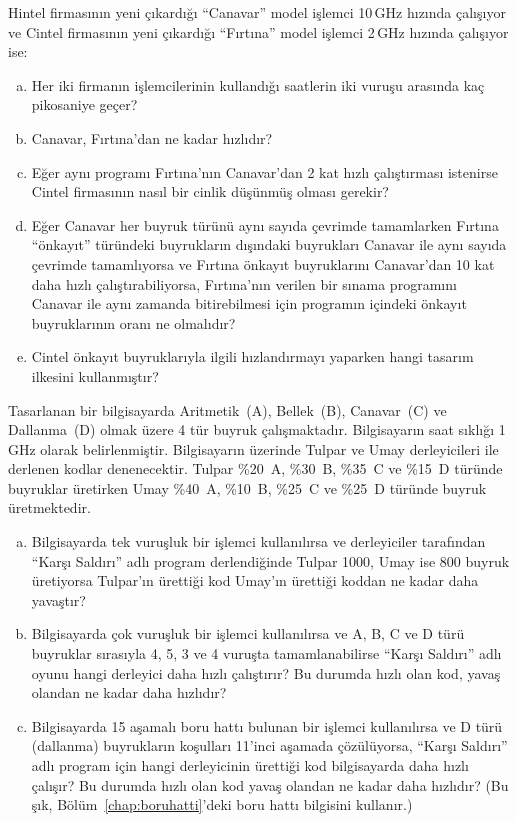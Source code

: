 \begin{alistirma}[\zor]
Hintel firmasının yeni çıkardığı ``Canavar'' model işlemci 10\,GHz hızında çalışıyor ve Cintel firmasının yeni çıkardığı ``Fırtına'' model işlemci 2\,GHz hızında çalışıyor ise:
\begin{enumerate}[(a)]
    \item Her iki firmanın işlemcilerinin kullandığı saatlerin iki vuruşu arasında kaç pikosaniye geçer?
    \item Canavar, Fırtına'dan ne kadar hızlıdır?
    \item Eğer aynı programı Fırtına'nın Canavar'dan 2 kat hızlı çalıştırması istenirse Cintel firmasının nasıl bir cinlik düşünmüş olması gerekir?
    \item Eğer Canavar her buyruk türünü aynı sayıda çevrimde tamamlarken Fırtına ``önkayıt'' türündeki buyrukların dışındaki buyrukları Canavar ile aynı sayıda çevrimde tamamlıyorsa ve Fırtına önkayıt buyruklarını Canavar'dan 10 kat daha hızlı çalıştırabiliyorsa, Fırtına'nın verilen bir sınama programını Canavar ile aynı zamanda bitirebilmesi için programın içindeki önkayıt buyruklarının oranı ne olmalıdır?
    \item Cintel önkayıt buyruklarıyla ilgili hızlandırmayı yaparken hangi tasarım ilkesini kullanmıştır?
\end{enumerate}
\end{alistirma}

\begin{alistirma}[\zor]
Tasarlanan bir bilgisayarda Aritmetik~(A), Bellek~(B), Canavar~(C) ve Dallanma~(D) olmak üzere 4 tür buyruk çalışmaktadır. Bilgisayarın saat sıklığı 1\,GHz olarak belirlenmiştir. Bilgisayarın üzerinde Tulpar ve Umay derleyicileri ile derlenen kodlar denenecektir. Tulpar \%20~A, \%30~B, \%35~C ve \%15~D türünde buyruklar üretirken Umay \%40~A, \%10~B, \%25~C ve \%25~D türünde buyruk üretmektedir.
\begin{enumerate}[(a)]
    \item Bilgisayarda tek vuruşluk bir işlemci kullanılırsa ve derleyiciler tarafından ``Karşı Saldırı'' adlı program derlendiğinde Tulpar 1000, Umay ise 800 buyruk üretiyorsa Tulpar'ın ürettiği kod Umay'ın ürettiği koddan ne kadar daha yavaştır?
    \item Bilgisayarda çok vuruşluk bir işlemci kullanılırsa ve A, B, C ve D türü buyruklar sırasıyla 4, 5, 3 ve 4 vuruşta tamamlanabilirse ``Karşı Saldırı'' adlı oyunu hangi derleyici daha hızlı çalıştırır? Bu durumda hızlı olan kod, yavaş olandan ne kadar daha hızlıdır?
    \item Bilgisayarda 15 aşamalı boru hattı bulunan bir işlemci kullanılırsa ve D türü (dallanma) buyrukların koşulları 11'inci aşamada çözülüyorsa, ``Karşı Saldırı'' adlı program için hangi derleyicinin ürettiği kod bilgisayarda daha hızlı çalışır? Bu durumda hızlı olan kod yavaş olandan ne kadar daha hızlıdır? (Bu şık, Bölüm~\ref{chap:boruhatti}'deki boru hattı bilgisini kullanır.)
\end{enumerate}
\end{alistirma}

